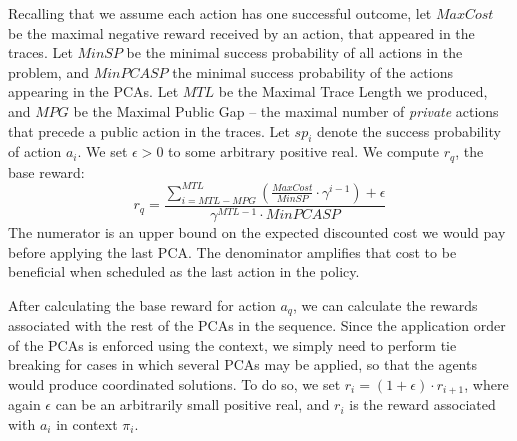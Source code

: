 {Recalling that we assume each action has one successful outcome,
let $MaxCost$ be the maximal negative reward received by an action, that appeared in the traces.
Let $MinSP$ be the minimal success probability of all actions in the problem, and $MinPCASP$ the minimal success probability of the actions appearing in the PCAs. Let $MTL$ be the Maximal Trace Length we produced, and $MPG$ be the Maximal Public Gap -- the maximal number of \emph{private} actions that precede a public action in the traces. Let $sp_i$ denote the success probability of action $a_i$. We set $\epsilon > 0$ to some arbitrary positive real. We compute $r_q$, the base reward:
\begin{equation}
\label{eqn:rq}
   r_q = \frac{\sum_{i=MTL - MPG}^{MTL}(\frac{MaxCost}{MinSP} \cdot \gamma^{i-1})+ \epsilon}{\gamma^{MTL-1}\cdot MinPCASP} 
\end{equation}%
The numerator is an upper bound on the expected discounted cost we would pay before applying the last PCA. The denominator amplifies that cost to be beneficial when scheduled as the last action in the policy.


After calculating the base reward for action $a_q$, 
we can calculate the rewards associated with the rest of the PCAs in the sequence. Since the application order of the PCAs is enforced using the context, we simply need to perform tie breaking for cases in which several PCAs may be applied, so that the agents would produce coordinated solutions.
To do so, we set $r_i=(1+\epsilon)\cdot r_{i+1}$, where again $\epsilon$ can be an arbitrarily small positive real, and $r_i$ is
the reward associated with $a_i$ in context $\pi_i$.


}
